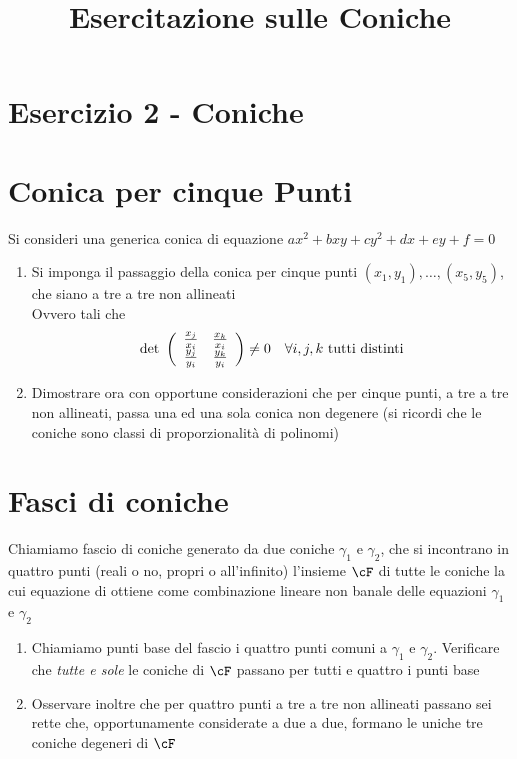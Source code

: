 \documentclass[a4paper,NoNotes,GeneralMath]{stdmdoc}
\begin{document}
	\section*{Esercizio 2 - Coniche}
	
	
	\newpage
	\title{Esercitazione sulle Coniche}
	\section*{Conica per cinque Punti}
	Si consideri una generica conica di equazione $ax^2 + bxy + cy^2 + dx + ey + f = 0$
	\begin{enumerate}
		\item Si imponga il passaggio della conica per cinque punti $(x_1, y_1), \ldots, (x_5, y_5)$, che siano a tre a tre non allineati \\Ovvero tali che $$\mbox{det } \left( \begin{array}{cc} \frac{x_j}{x_i} & \frac{x_k}{x_i} \\ \frac{y_j}{y_i} & \frac{y_k}{y_i} \end{array} \right) \neq 0 \quad \forall i,j,k \text{ tutti distinti}$$
		\item Dimostrare ora con opportune considerazioni che per cinque punti, a tre a tre non allineati, passa una ed una sola conica non degenere (si ricordi che le coniche sono classi di proporzionalità di polinomi)
	\end{enumerate}

	\section*{Fasci di coniche}
	Chiamiamo fascio di coniche generato da due coniche $\gamma_1$ e $\gamma_2$, che si incontrano in quattro punti (reali o no, propri o all'infinito) l'insieme $\cF$ di tutte le coniche la cui equazione di ottiene come combinazione lineare non banale delle equazioni $\gamma_1$ e $\gamma_2$
	\begin{enumerate}
		\item Chiamiamo punti base del fascio i quattro punti comuni a $\gamma_1$ e $\gamma_2$. Verificare che {\it tutte e sole} le coniche di $\cF$ passano per tutti e quattro i punti base
		\item Osservare inoltre che per quattro punti a tre a tre non allineati passano sei rette che, opportunamente considerate a due a due, formano le uniche tre coniche degeneri di $\cF$
	\end{enumerate}
	
\end{document}
